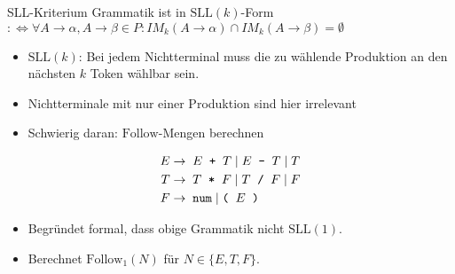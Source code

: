 \documentclass{beamer}
\begin{document}
\begin{frame}{SLL-Kriterium}
	Grammatik ist in $\textrm{SLL}(k)$-Form\\
	$:\Leftrightarrow \forall A \to \alpha, A \to \beta \in P: IM_k(A \to \alpha) \cap IM_k(A \to \beta) = \emptyset$

	\begin{itemize}
		\item $\textrm{SLL}(k)$: Bei jedem Nichtterminal muss die zu wählende Produktion an den nächsten $k$ Token wählbar sein.
		\item Nichtterminale mit nur einer Produktion sind hier irrelevant
		\item Schwierig daran: $\textrm{Follow}$-Mengen berechnen
	\end{itemize}
	\pause
	\begin{align*}
		E \to & \;\; E \;\; \textrm{\texttt{+}} \;\; T \mid E \;\; \textrm{\texttt{-}} \;\; T \mid T\\
		T \to & \;\; T \;\; \textrm{\texttt{*}} \;\; F \mid T \;\; \textrm{\texttt{/}} \;\; F \mid F\\
		F \to & \;\; \textrm{\texttt{num}} \; | \; \textrm{\texttt{(}} \;\; E \;\; \textrm{\texttt{)}}
	\end{align*}
	
	\begin{itemize}
		\item Begründet formal, dass obige Grammatik nicht $\textrm{SLL}(1)$.
		\item Berechnet $\textrm{Follow}_1(N)$ für $N \in \{ E, T, F \}$.
	\end{itemize}
\end{frame}
\end{document}
